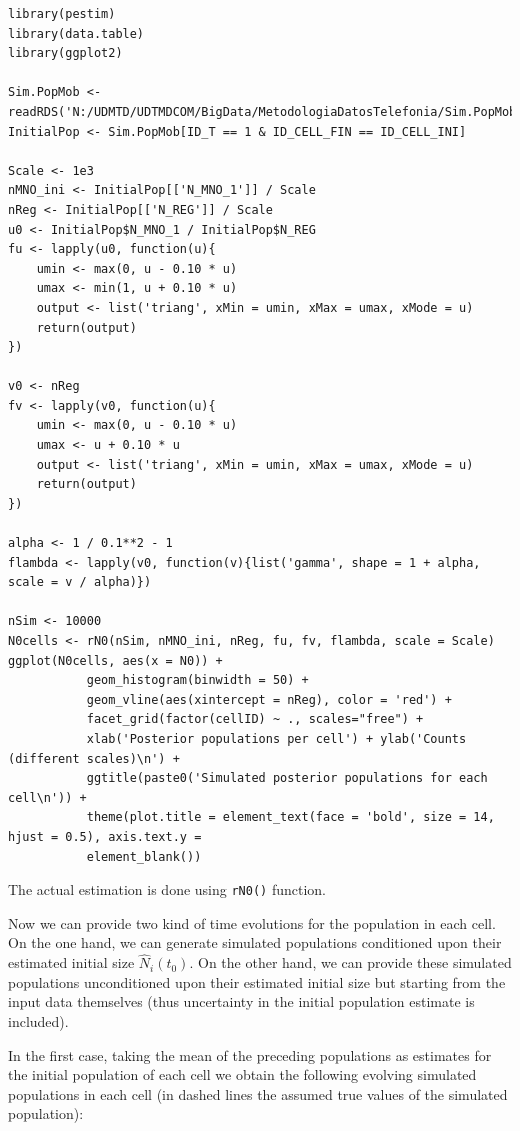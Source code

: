 \documentclass[12pt, a4paper]{article}
\begin{document}
\begin{verbatim}
library(pestim)
library(data.table)
library(ggplot2)

Sim.PopMob <- readRDS('N:/UDMTD/UDTMDCOM/BigData/MetodologiaDatosTelefonia/Sim.PopMob.rds')
InitialPop <- Sim.PopMob[ID_T == 1 & ID_CELL_FIN == ID_CELL_INI]

Scale <- 1e3
nMNO_ini <- InitialPop[['N_MNO_1']] / Scale
nReg <- InitialPop[['N_REG']] / Scale
u0 <- InitialPop$N_MNO_1 / InitialPop$N_REG
fu <- lapply(u0, function(u){
    umin <- max(0, u - 0.10 * u)
    umax <- min(1, u + 0.10 * u)
    output <- list('triang', xMin = umin, xMax = umax, xMode = u)
    return(output)
})

v0 <- nReg
fv <- lapply(v0, function(u){
    umin <- max(0, u - 0.10 * u)
    umax <- u + 0.10 * u
    output <- list('triang', xMin = umin, xMax = umax, xMode = u)
    return(output)
})

alpha <- 1 / 0.1**2 - 1
flambda <- lapply(v0, function(v){list('gamma', shape = 1 + alpha, scale = v / alpha)})

nSim <- 10000
N0cells <- rN0(nSim, nMNO_ini, nReg, fu, fv, flambda, scale = Scale)
ggplot(N0cells, aes(x = N0)) + 
           geom_histogram(binwidth = 50) +
           geom_vline(aes(xintercept = nReg), color = 'red') +
           facet_grid(factor(cellID) ~ ., scales="free") +
           xlab('Posterior populations per cell') + ylab('Counts (different scales)\n') +
           ggtitle(paste0('Simulated posterior populations for each cell\n')) +
           theme(plot.title = element_text(face = 'bold', size = 14, hjust = 0.5), axis.text.y =
           element_blank())
\end{verbatim}

The actual estimation is done using \texttt{rN0()} function.


Now we can provide two kind of time evolutions for the population in each cell. On the one hand, we can generate simulated populations conditioned upon their estimated initial size $\widehat{N}_{i}(t_{0})$. On the other hand, we can provide these simulated populations unconditioned upon their estimated initial size but starting from the input data themselves (thus uncertainty in the initial population estimate is included).

In the first case, taking the mean of the preceding populations as estimates for the initial population of each cell we obtain the following evolving simulated populations in each cell (in dashed lines the assumed true values of the simulated population):
\end{document}
